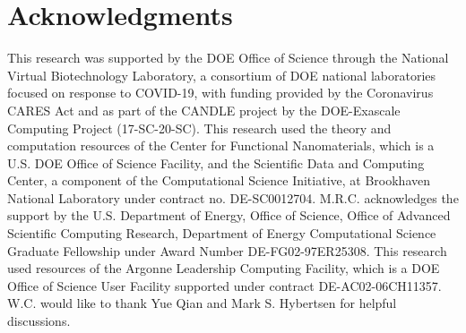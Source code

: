 \section{Acknowledgments}
This research was supported by the DOE Office of Science through the National Virtual Biotechnology Laboratory, a consortium of DOE national laboratories focused on response to COVID-19, with funding provided by the Coronavirus CARES Act and as part of the CANDLE project by the DOE-Exascale Computing Project (17-SC-20-SC).
This research used the theory and computation resources of the Center for Functional
Nanomaterials, which is a U.S. DOE Office of Science Facility,
and the Scientific Data and Computing Center, a component
of the Computational Science Initiative, at Brookhaven
National Laboratory under contract no. DE-SC0012704.
M.R.C. acknowledges the support by the U.S. Department of Energy, Office of Science, Office of Advanced Scientific Computing Research, Department of Energy Computational Science Graduate Fellowship under Award Number DE-FG02-97ER25308.
This research used resources of the Argonne Leadership Computing Facility, which is a DOE Office of Science User Facility supported under contract DE-AC02-06CH11357.
W.C. would like to thank Yue Qian and Mark S. Hybertsen for helpful discussions.

